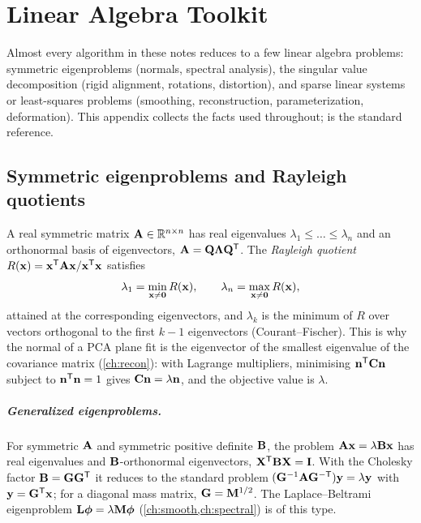 \chapter{Linear Algebra Toolkit}\label{app:linalg}

Almost every algorithm in these notes reduces to a few linear algebra problems: symmetric
eigenproblems (normals, spectral analysis), the singular value decomposition (rigid alignment,
rotations, distortion), and sparse linear systems or least-squares problems (smoothing,
reconstruction, parameterization, deformation). This appendix collects the facts used throughout;
\citet{Golub2013} is the standard reference.

\section{Symmetric eigenproblems and Rayleigh quotients}

A real symmetric matrix $\mathbf{A}\in\mathbb{R}^{n\times n}$ has real eigenvalues $\lambda_1\le\dots\le\lambda_n$
and an orthonormal basis of eigenvectors, $\mathbf{A}=\mathbf{Q}\boldsymbol{\Lambda}\mathbf{Q}^{\mathsf{T}}$. The \emph{Rayleigh quotient}
$R(\mathbf{x})=\mathbf{x}^{\mathsf{T}}\mathbf{A}\mathbf{x}/\mathbf{x}^{\mathsf{T}}\mathbf{x}$ satisfies
\begin{equation}
\lambda_1=\min_{\mathbf{x}\neq\mathbf{0}}R(\mathbf{x}),\qquad\lambda_n=\max_{\mathbf{x}\neq\mathbf{0}}R(\mathbf{x}),
\end{equation}
attained at the corresponding eigenvectors, and $\lambda_k$ is the minimum of $R$ over vectors
orthogonal to the first $k-1$ eigenvectors (Courant--Fischer). This is why the normal of a PCA plane fit
is the eigenvector of the smallest eigenvalue of the covariance matrix (\cref{ch:recon}): with
Lagrange multipliers, minimising $\mathbf{n}^{\mathsf{T}}\mathbf{C}\mathbf{n}$ subject to $\mathbf{n}^{\mathsf{T}}\mathbf{n}=1$ gives $\mathbf{C}\mathbf{n}=\lambda\mathbf{n}$, and the
objective value is $\lambda$.

\paragraph{Generalized eigenproblems.} For symmetric $\mathbf{A}$ and symmetric positive definite $\mathbf{B}$, the
problem $\mathbf{A}\mathbf{x}=\lambda\mathbf{B}\mathbf{x}$ has real eigenvalues and $\mathbf{B}$-orthonormal eigenvectors,
$\mathbf{X}^{\mathsf{T}}\mathbf{B}\mathbf{X}=\mathbf{I}$. With the Cholesky factor $\mathbf{B}=\mathbf G\mathbf G^{\mathsf{T}}$ it reduces to the standard
problem $(\mathbf G^{-1}\mathbf{A}\mathbf G^{-\mathsf T})\mathbf{y}=\lambda\mathbf{y}$ with $\mathbf{y}=\mathbf G^{\mathsf{T}}\mathbf{x}$; for a diagonal
mass matrix, $\mathbf G=\mathbf{M}^{1/2}$. The Laplace--Beltrami eigenproblem $\mathbf{L}\boldsymbol{\phi}=\lambda\mathbf{M}\boldsymbol{\phi}$
(\cref{ch:smooth,ch:spectral}) is of this type.

